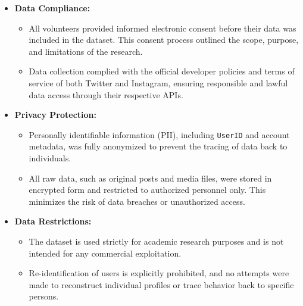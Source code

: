 \begin{itemize}
	\item \textbf{Data Compliance:}
	\begin{itemize}
		\item All volunteers provided informed electronic consent before their data was included in the dataset. This consent process outlined the scope, purpose, and limitations of the research.
		\item Data collection complied with the official developer policies and terms of service of both Twitter and Instagram, ensuring responsible and lawful data access through their respective APIs.
	\end{itemize}
	
	\item \textbf{Privacy Protection:}
	\begin{itemize}
		\item Personally identifiable information (PII), including \texttt{UserID} and account metadata, was fully anonymized to prevent the tracing of data back to individuals.
		\item All raw data, such as original posts and media files, were stored in encrypted form and restricted to authorized personnel only. This minimizes the risk of data breaches or unauthorized access.
	\end{itemize}
	
	\item \textbf{Data Restrictions:}
	\begin{itemize}
		\item The dataset is used strictly for academic research purposes and is not intended for any commercial exploitation.
		\item Re-identification of users is explicitly prohibited, and no attempts were made to reconstruct individual profiles or trace behavior back to specific persons.
	\end{itemize}
\end{itemize}



\begin{comment}
If applicable, describe possible commercialization and/or innovation in your research.
\end{comment}